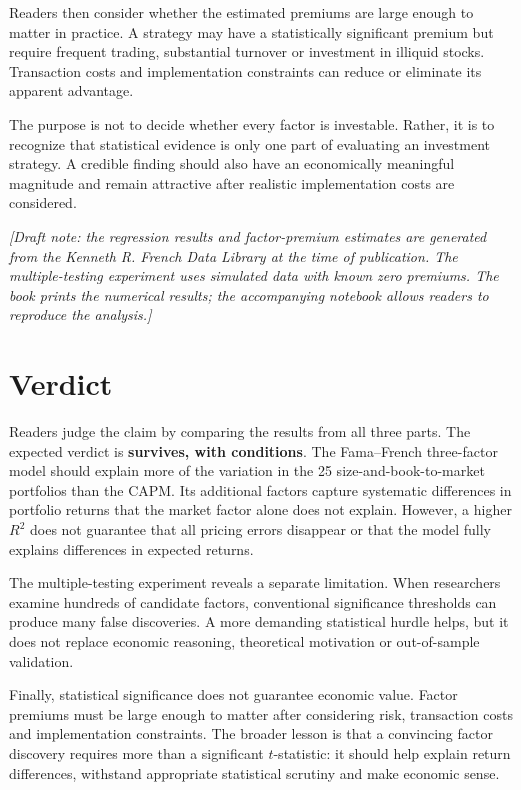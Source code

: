 Readers then consider whether the estimated premiums are large enough to matter in practice. A strategy may have a statistically significant premium but require frequent trading, substantial turnover or investment in illiquid stocks. Transaction costs and implementation constraints can reduce or eliminate its apparent advantage.

The purpose is not to decide whether every factor is investable. Rather, it is to recognize that statistical evidence is only one part of evaluating an investment strategy. A credible finding should also have an economically meaningful magnitude and remain attractive after realistic implementation costs are considered.

\emph{[Draft note: the regression results and factor-premium estimates are generated from the Kenneth R. French Data Library at the time of publication. The multiple-testing experiment uses simulated data with known zero premiums. The book prints the numerical results; the accompanying notebook allows readers to reproduce the analysis.]}

\section{Verdict}
\label{sec:03-verdict}

Readers judge the claim by comparing the results from all three parts. The expected verdict is \textbf{survives, with conditions}. The Fama--French three-factor model should explain more of the variation in the 25 size-and-book-to-market portfolios than the CAPM. Its additional factors capture systematic differences in portfolio returns that the market factor alone does not explain. However, a higher $R^2$ does not guarantee that all pricing errors disappear or that the model fully explains differences in expected returns.

The multiple-testing experiment reveals a separate limitation. When researchers examine hundreds of candidate factors, conventional significance thresholds can produce many false discoveries. A more demanding statistical hurdle helps, but it does not replace economic reasoning, theoretical motivation or out-of-sample validation.

Finally, statistical significance does not guarantee economic value. Factor premiums must be large enough to matter after considering risk, transaction costs and implementation constraints. The broader lesson is that a convincing factor discovery requires more than a significant $t$-statistic: it should help explain return differences, withstand appropriate statistical scrutiny and make economic sense.

